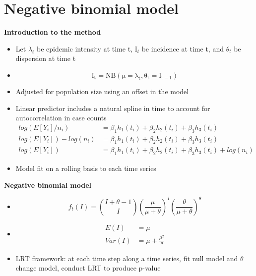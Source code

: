 \documentclass{beamer}
\begin{document}
\section{Negative binomial model}
\begin{frame}{\textbf{Introduction to the method}}
    \begin{itemize}[<+->] %
		\item Let \begin{math}\lambda_t\end{math} be epidemic intensity at time t, I\begin{math}_t\end{math} be incidence at time t, and \begin{math}\theta_t\end{math} be dispersion at time t
		\item \begin{equation}\mathrm{I_t = NB(\mu = \lambda_t, \theta_t = I_{t-1})} 
		\end{equation} \cite{grenfell_dynamics_2002}
		\item Adjusted for population size using an offset in the model
		\item Linear predictor includes a natural spline in time to account for autocorrelation in case counts
		\begin{align}
			log(E[Y_i]/n_i) &= \beta_1h_1(t_i) + \beta_2h_2(t_i) + \beta_3h_3(t_i) \\
			log(E[Y_i])-log(n_i) &= \beta_1h_1(t_i) + \beta_2h_2(t_i) + \beta_3h_3(t_i) \\ 
			log(E[Y_i]) &= \beta_1h_1(t_i) + \beta_2h_2(t_i) + \beta_3h_3(t_i) + log(n_i) 
		\end{align}
            \item Model fit on a rolling basis to each time series
	\end{itemize}
\end{frame}

\begin{frame}{\textbf{Negative binomial model}}
\begin{itemize}[<+->] %
		\item 
            \begin{equation}
                f_t(I) = \binom{I + \theta - 1}{I} \left( \frac{\mu}{\mu+\theta} \right)^I \left( \frac{\theta}{\mu +\theta} \right)^\theta
            \end{equation}
		\item \begin{align}
		E(I) &= \mu\\
		Var(I) &= \mu + \frac{\mu^2}{\theta}
	\end{align}
	\item LRT framework: at each time step along a time series, fit null model and \begin{math}\theta\end{math} change model, conduct LRT to produce p-value
	\end{itemize}
\end{frame}
\end{document}
